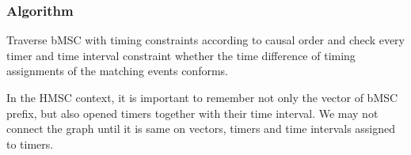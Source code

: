 \documentclass{article}
\begin{document}
\subsubsection*{Algorithm} Traverse bMSC with timing constraints according to causal order and check every timer and time interval constraint whether the time difference of timing assignments of the matching events conforms.

In the HMSC context, it is important to remember not only the vector of bMSC prefix, but also opened timers together with their time interval. We may not connect the graph until it is same  on vectors, timers and time intervals assigned to timers. 










\end{document}
